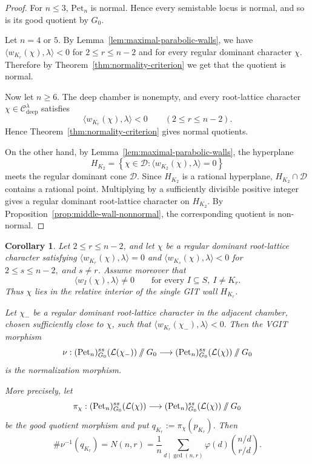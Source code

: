 \documentclass[12pt, reqno]{amsart}
\newcommand{\sslash}{\mathbin{/\mkern-6mu/}}
\theoremstyle{plain}
\numberwithin{equation}{section}
\newtheorem{corollary}[theorem]{Corollary}
\theoremstyle{definition}
\begin{document}
\begin{proof}
For \(n\le3\), 
\(\mathrm{Pet}_n\) is normal. Hence every semistable locus is normal,
and so is its good quotient by \(G_0\).

Let \(n=4\) or \(5\). By
Lemma~\ref{lem:maximal-parabolic-walls}, we have $\langle w_{K_r}(\chi),\lambda\rangle<0$ for $2\le r\le n-2$ and 
for every regular dominant character \(\chi\). Therefore
by Theorem~\ref{thm:normality-criterion} we get that the
quotient is normal.

Now let \(n\ge6\). The deep chamber is nonempty, and every
root-lattice character
\(\chi\in\mathcal C^\lambda_{\mathrm{deep}}\) satisfies
\[
\langle w_{K_r}(\chi),\lambda\rangle<0
\qquad
(2\le r\le n-2).
\]
Hence Theorem~\ref{thm:normality-criterion} gives normal quotients.

On the other hand, by Lemma~\ref{lem:maximal-parabolic-walls}, the hyperplane
\[
H_{K_2}
=
\left\{
\chi\in\mathcal D:
\langle w_{K_2}(\chi),\lambda\rangle=0
\right\}
\]
meets the regular dominant cone \(\mathcal D\). Since \(H_{K_2}\) is
a rational hyperplane, \(H_{K_2}\cap\mathcal D\) contains a rational
point. Multiplying by a sufficiently divisible positive integer gives
a regular dominant root-lattice character on \(H_{K_2}\). By
Proposition~\ref{prop:middle-wall-nonnormal}, the corresponding quotient is non-normal.
\end{proof}

\begin{corollary}\label{cor:generic-wall-normalization}
Let \(2\le r\le n-2\), and let \(\chi\) be a regular dominant
root-lattice character satisfying $\langle w_{K_r}(\chi),\lambda\rangle=0$
and $\langle w_{K_s}(\chi),\lambda\rangle<0$ for $2\le s\le n-2, \,\,  and \,\, s\neq r$.
Assume moreover that
\[
\langle w_I(\chi),\lambda\rangle\neq0
\qquad
\text{for every }I\subseteq S,\ I\neq K_r.
\]
Thus \(\chi\) lies in the relative interior of the single GIT wall
\(H_{K_r}\).

Let \(\chi_-\) be a regular dominant root-lattice character in the
adjacent chamber, chosen sufficiently close to \(\chi\), such that $\langle w_{K_r}(\chi_-),\lambda\rangle<0.$
Then the VGIT morphism
\[
\nu:
(\mathrm{Pet}_n)^{ss}_{G_0}(\mathcal L(\chi_-))
\sslash G_0
\longrightarrow
(\mathrm{Pet}_n)^{ss}_{G_0}(\mathcal L(\chi))
\sslash G_0
\]
is the normalization morphism.

More precisely, let
\[
\pi_\chi:
(\mathrm{Pet}_n)^{ss}_{G_0}(\mathcal L(\chi))
\longrightarrow
(\mathrm{Pet}_n)^{ss}_{G_0}(\mathcal L(\chi))
\sslash G_0
\]
be the good quotient morphism and put $
q_{K_r}:=\pi_\chi(p_{K_r}).$
Then
\[
\#\nu^{-1}(q_{K_r})
=
N(n,r)
=
\frac1n
\sum_{d\mid\gcd(n,r)}
\varphi(d)
\binom{n/d}{r/d}.
\]
\end{corollary}
\end{document}
